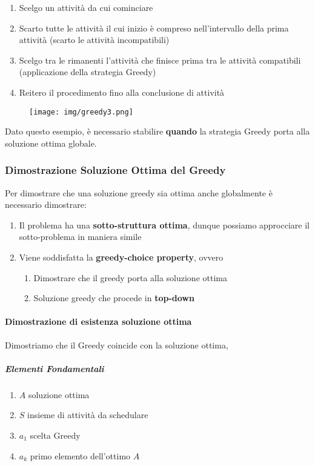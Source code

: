 \documentclass{article}
\begin{document}
\begin{enumerate}
    \item Scelgo un attività da cui cominciare
    \item Scarto tutte le attività il cui inizio è compreso nell'intervallo della prima attività (scarto le attività incompatibili)
    \item Scelgo tra le rimanenti l'attività che finisce prima tra le attività compatibili (applicazione della strategia Greedy)
    \item Reitero il procedimento fino alla conclusione di attività
\end{enumerate}

\begin{figure}[htbp]
        \center
        \texttt{[image: img/greedy3.png]}
\end{figure}

Dato questo esempio, è necessario stabilire \textbf{quando} la strategia Greedy porta alla soluzione ottima globale.

\newpage

\subsubsection{Dimostrazione Soluzione Ottima del Greedy} Per dimostrare che una soluzione greedy sia ottima anche globalmente è necessario dimostrare:

\begin{enumerate}
    \item Il problema ha una \textbf{sotto-struttura ottima}, dunque possiamo approcciare il sotto-problema in maniera simile
    \item Viene soddisfatta la \textbf{greedy-choice property}, ovvero
    \begin{enumerate}
        \item Dimostrare che il greedy porta alla soluzione ottima
        \item Soluzione greedy che procede in \textbf{top-down}
    \end{enumerate}
\end{enumerate}

\paragraph{Dimostrazione di esistenza soluzione ottima} Dimostriamo che il Greedy coincide con la soluzione ottima, 
\subparagraph{Elementi Fondamentali}
\begin{enumerate}
    \item $A$ soluzione ottima
    \item $S$ insieme di attività da schedulare
    \item $a_{1}$ scelta Greedy
    \item $a_{k}$ primo elemento dell'ottimo $A$
\end{enumerate}
\end{document}
